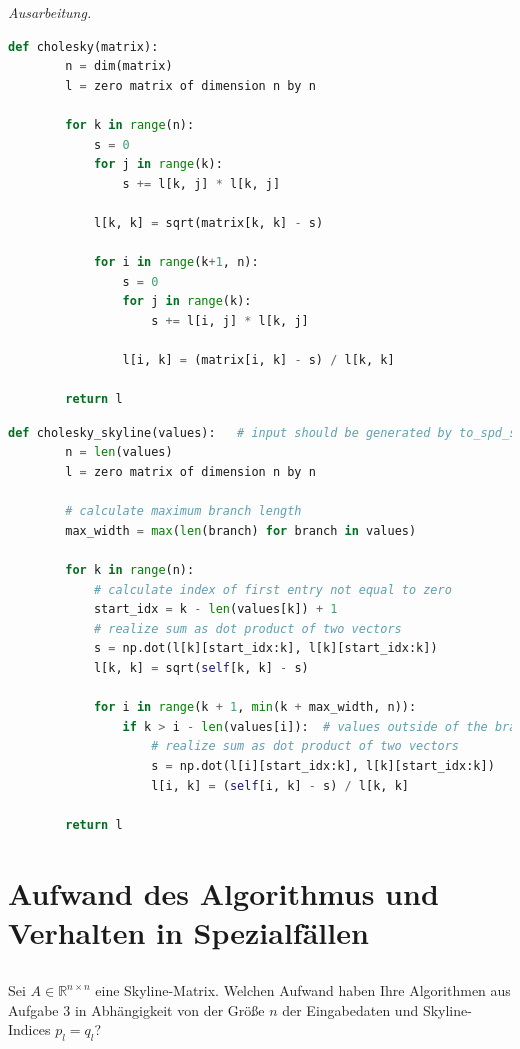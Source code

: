 \documentclass[titlepage]{article}
\newenvironment{ausarbeitung}{\vspace{3mm}\noindent\textit{Ausarbeitung.}}{}
\begin{document}
\begin{ausarbeitung}
	\begin{lstlisting}[language=Python, caption=Algorithmus für die Cholesky Zerlegung einer Matrix aus der Vorlesung]
	def cholesky(matrix):	
		n = dim(matrix)
		l = zero matrix of dimension n by n

		for k in range(n):
			s = 0
			for j in range(k):
				s += l[k, j] * l[k, j]

			l[k, k] = sqrt(matrix[k, k] - s)

			for i in range(k+1, n):
				s = 0
				for j in range(k):
					s += l[i, j] * l[k, j]

				l[i, k] = (matrix[i, k] - s) / l[k, k]

		return l
	\end{lstlisting}
	
	\begin{lstlisting}[language=Python, caption=Optimierter Algorithmus für die Cholesky Zerlegung einer Skyline-Matrix]
	def cholesky_skyline(values):	# input should be generated by to_spd_skyline
		n = len(values)
		l = zero matrix of dimension n by n

		# calculate maximum branch length
		max_width = max(len(branch) for branch in values)

		for k in range(n):
			# calculate index of first entry not equal to zero
			start_idx = k - len(values[k]) + 1
			# realize sum as dot product of two vectors
			s = np.dot(l[k][start_idx:k], l[k][start_idx:k])
			l[k, k] = sqrt(self[k, k] - s)

			for i in range(k + 1, min(k + max_width, n)):
				if k > i - len(values[i]):	# values outside of the branch are zero
					# realize sum as dot product of two vectors
					s = np.dot(l[i][start_idx:k], l[k][start_idx:k])
					l[i, k] = (self[i, k] - s) / l[k, k]

		return l
	\end{lstlisting}
\end{ausarbeitung}
\newpage



\section{Aufwand des Algorithmus und Verhalten in Spezialfällen}


\subsection{}
Sei $A \in \mathbb{R}^{n\times n}$ eine Skyline-Matrix. Welchen Aufwand haben Ihre Algorithmen aus Aufgabe 3 in Abhängigkeit von der Größe $n$ der Eingabedaten und Skyline-Indices $p_l = q_l$?
\end{document}
